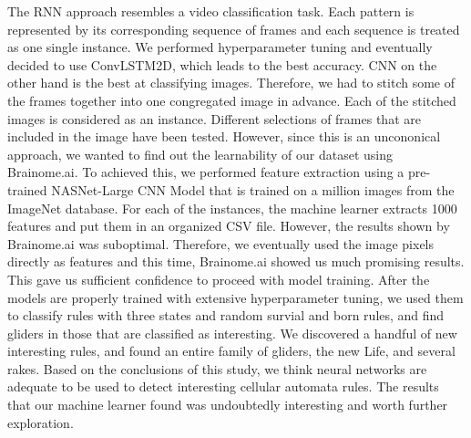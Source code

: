 \documentclass[12pt]{article}
\numberwithin{figure}{section} %
\begin{document}
The RNN approach resembles a video classification task. Each pattern is represented by its corresponding sequence of frames and each sequence is treated as one single instance. We performed hyperparameter tuning and eventually decided to use ConvLSTM2D, which leads to the best accuracy. CNN on the other hand is the best at classifying images. Therefore, we had to stitch some of the frames together into one congregated image in advance. Each of the stitched images is considered as an instance. Different selections of frames that are included in the image have been tested. However, since this is an uncononical approach, we wanted to find out the learnability of our dataset using Brainome.ai. To achieved this, we performed feature extraction using a pre-trained NASNet-Large CNN Model that is trained on a million images from the ImageNet database. For each of the instances, the machine learner extracts 1000 features and put them in an organized CSV file. However, the results shown by Brainome.ai was suboptimal. Therefore, we eventually used the image pixels directly as features and this time, Brainome.ai showed us much promising results. This gave us sufficient confidence to proceed with model training. 
After the models are properly trained with extensive hyperparameter tuning, we used them to classify rules with three states and random survial and born rules, and find gliders in those that are classified as interesting. We discovered a handful of new interesting rules, and found an entire family of gliders, the new Life, and several rakes. 
Based on the conclusions of this study, we think neural networks are adequate to be used to detect interesting cellular automata rules. The results that our machine learner found was undoubtedly interesting and worth further exploration. 
\end{document}

